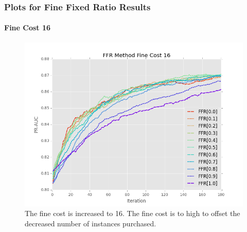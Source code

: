 \documentclass{beamer}
\begin{document}
\begin{frame}
    \frametitle{Plots for Fine Fixed Ratio Results}  %
    \framesubtitle{Fine Cost 16}
    \begin{figure}[!htb]
        \centering
        \includegraphics[width=0.8\columnwidth]{fig/ParamsFFR_PR_Cost16_rnds0_180}
        \caption{The fine cost is increased to 16. The fine cost is to high to offset the decreased number of instances purchased.}
        \label{fig:ParamsFFR_PR_Cost16_rnds0_180}
    \end{figure}
\end{frame}
\end{document}
